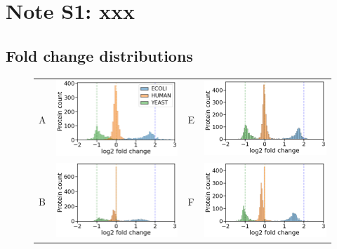 \documentclass[11pt]{article}
\begin{document}
\maketitle

\section*{Note S1: xxx}
\label{sec:fc-eval}


\subsection*{Fold change distributions}
\begin{figure}[hbt]
    \centering
    \begin{tabular}{lclc} 
        A & \includegraphics[width=0.4\linewidth]{../../result/report_plots/osw_triqler_intensity.png} & 
        E & \includegraphics[width=0.4\linewidth]{../../result/report_plots/diann_triqler_intensity.png} \\ 
        B & \includegraphics[width=0.4\linewidth]{../../result/report_plots/osw_msqrobsum_intensity.png} & 
        F & \includegraphics[width=0.4\linewidth]{../../result/report_plots/diann_msqrobsum_intensity.png} \\ 

\end{tabular}
\end{figure}
\end{document}
